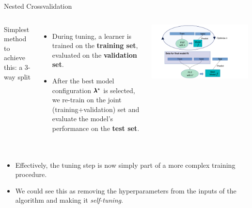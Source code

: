 \begin{frame}{Nested Crossvalidation}
\framebreak

\vspace{1cm}
\begin{columns}[c, onlytextwidth]
\hspace*{-0.3cm}
Simplest method to achieve this: a 3-way split
\begin{itemize}
\item During tuning, a learner is trained on the \textbf{training set},
  evaluated on the  \textbf{validation set}.
\item After the best model configuration $\pmb{\lambda}^\star$ is selected, we re-train on the joint (training+validation) set and evaluate the model's performance on the \textbf{test set}.
\end{itemize}

\hspace*{-0.7cm}
\begin{center}
\includegraphics[width=1.2\textwidth]{images/train_valid_test.pdf}
\end{center}
\end{columns}
\framebreak


\vspace{1cm}
\begin{columns}[c, onlytextwidth]
\hspace*{-0.3cm}
\begin{itemize}
\item Effectively, the tuning step is now simply part of a more complex training procedure.
\item We could see this as removing the hyperparameters from the inputs of the algorithm and making it \textit{self-tuning}.
\end{itemize}


\end{columns}
\end{frame}
